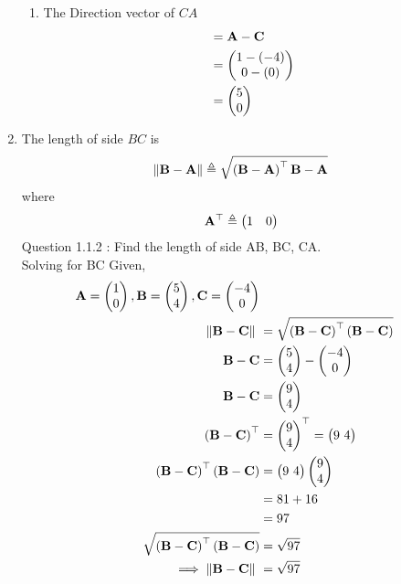 \documentclass[11pt]{book}
\begin{document}
\begin{enumerate}[label=\thesection.\arabic*.,ref=\thesection.\theenumi]
\begin{enumerate}
  \item  The Direction vector of $CA$  \begin{align} &= \mathbf{A} - \mathbf{C} \\ 
 &= \begin{pmatrix} 1 - (-4)\\ 0 - (0) \end{pmatrix} \\&= \begin{pmatrix} 5\\ 0 \end{pmatrix}
  \end{align}
 \end{enumerate}

\item The length of side $BC$ is 
		\begin{align}
			\left\lVert\mathbf{B}-\mathbf{A}\right\rVert \triangleq \sqrt{\left(\mathbf{B}-\mathbf{A}\right)^{\top}{\mathbf{B}-\mathbf{A}}}
		\end{align}
		where
		\begin{align}
			\mathbf{A}^{\top}\triangleq\begin{pmatrix}1 & 0\end{pmatrix}
		\end{align}
Question 1.1.2 : Find the length of side AB, BC, CA.\\
\solution
Solving for BC
Given, 
\begin{align}
\vec{A} = \myvec{1\\0},
\vec{B} = \myvec{5\\4},
\vec{C} = \myvec{-4\\0} \\  
 \norm{\vec{B}-\vec{C}}\ &=  \sqrt{\brak{\vec{B}-\vec{C}}^{\top}\brak{\vec{B}-\vec{C}}} \\
 \vec{B}-\vec{C} &= \myvec{5 \\ 4} - \myvec{-4 \\ 0} \\
 \vec{B}-\vec{C} &= \myvec{9 \\ 4} \\
 \brak{\vec{B}-\vec{C}}^{\top} &= {\myvec{9 \\ 4}}^{\top} = \myvec{9 \ 4} \\
\brak{\vec{B}-\vec{C}}^{\top}\brak{\vec{B}-\vec{C}} &= \myvec{9 \ 4} \myvec{9 \\ 4}\\
             &= 81+16 \\
             &= 97 \\  
 \sqrt{\brak{\vec{B}-\vec{C}}^{\top}\brak{\vec{B}-\vec{C}}} &= \sqrt{97}	\\
	\implies \norm{\vec{B}-\vec{C}}\ &= \sqrt{97}
\end{align}


\end{enumerate}
\end{document}
